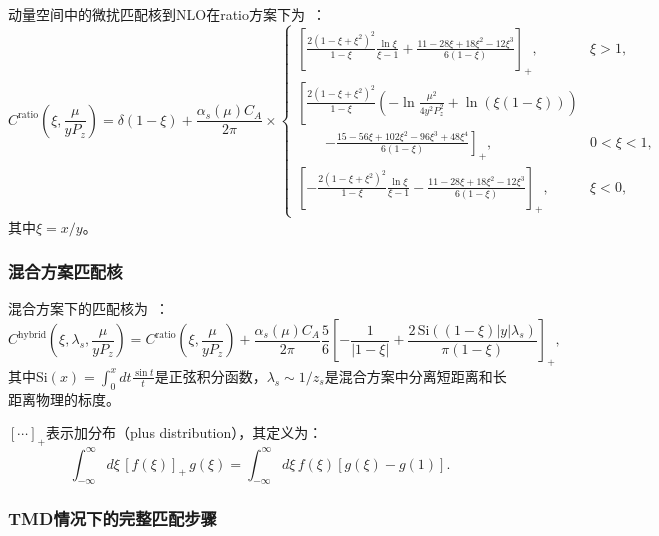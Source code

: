 \documentclass[12pt,a4paper]{ctexart}
\theoremstyle{definition}
\newcommand{\Pz}{P_z}
\newcommand{\alphas}{\alpha_s}
\newcommand{\CA}{C_A}
\begin{document}
动量空间中的微扰匹配核到NLO在ratio方案下为~\cite{Balitsky:2021mfb,Yao:2022skw}：
\begin{equation}\label{eq:Cratio}
    C^{\text{ratio}}\!\left(\xi, \frac{\mu}{y\Pz}\right) = \delta(1-\xi) + \frac{\alphas(\mu) \CA}{2\pi} \times
    \begin{cases}
        \displaystyle \left[\frac{2(1-\xi+\xi^2)^2}{1-\xi} \frac{\ln\xi}{\xi-1} + \frac{11-28\xi+18\xi^2-12\xi^3}{6(1-\xi)}\right]_+, & \xi > 1,\\[12pt]
        \displaystyle \left[\frac{2(1-\xi+\xi^2)^2}{1-\xi} \left(-\ln\frac{\mu^2}{4y^2\Pz^2} + \ln(\xi(1-\xi))\right) \right. \\
        \displaystyle \qquad \left. - \frac{15-56\xi+102\xi^2-96\xi^3+48\xi^4}{6(1-\xi)}\right]_+, & 0 < \xi < 1,\\[12pt]
        \displaystyle \left[-\frac{2(1-\xi+\xi^2)^2}{1-\xi} \frac{\ln\xi}{\xi-1} - \frac{11-28\xi+18\xi^2-12\xi^3}{6(1-\xi)}\right]_+, & \xi < 0,
    \end{cases}
\end{equation}
其中$\xi = x/y$。

\subsubsection{混合方案匹配核}

混合方案下的匹配核为~\cite{Ji:2020brr,Balitsky:2021mfb}：
\begin{equation}\label{eq:Chybrid}
    C^{\text{hybrid}}\!\left(\xi, \lambda_s, \frac{\mu}{y\Pz}\right) = C^{\text{ratio}}\!\left(\xi, \frac{\mu}{y\Pz}\right) + \frac{\alphas(\mu) \CA}{2\pi} \frac{5}{6} \left[-\frac{1}{|1-\xi|} + \frac{2\,\text{Si}((1-\xi)|y|\lambda_s)}{\pi(1-\xi)}\right]_+,
\end{equation}
其中$\text{Si}(x) = \int_0^x dt \frac{\sin t}{t}$是正弦积分函数，$\lambda_s \sim 1/z_s$是混合方案中分离短距离和长距离物理的标度。

$[\cdots]_+$表示加分布（plus distribution），其定义为：
\begin{equation}
    \int_{-\infty}^{\infty} d\xi \, [f(\xi)]_+ \, g(\xi) = \int_{-\infty}^{\infty} d\xi \, f(\xi) [g(\xi) - g(1)].
\end{equation}

\subsubsection{TMD情况下的完整匹配步骤}
\end{document}
